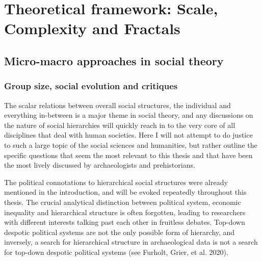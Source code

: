 \documentclass[
  12pt,
  a4paper, twoside]{book}
\begin{document}
\hypertarget{theory}{%
\chapter{Theoretical framework: Scale, Complexity and Fractals}\label{theory}}

\hypertarget{social-hierarchy}{%
\section{Micro-macro approaches in social theory}\label{social-hierarchy}}

\hypertarget{group-size-social-evolution-and-critiques}{%
\subsection{Group size, social evolution and critiques}\label{group-size-social-evolution-and-critiques}}

The scalar relations between overall social structures, the individual and everything in-between is a major theme in social theory, and any discussions on the nature of social hierarchies will quickly reach in to the very core of all disciplines that deal with human societies. Here I will not attempt to do justice to such a large topic of the social sciences and humanities, but rather outline the specific questions that seem the most relevant to this thesis and that have been the most lively discussed by archaeologists and prehistorians.

The political connotations to hierarchical social structures were already mentioned in the introduction, and will be evoked repeatedly throughout this thesis. The crucial analytical distinction between political system, economic inequality and hierarchical structure is often forgotten, leading to researchers with different interests talking past each other in fruitless debates. Top-down despotic political systems are not the only possible form of hierarchy, and inversely, a search for hierarchical structure in archaeological data is not a search for top-down despotic political systems (see Furholt, Grier, et al. 2020).
\end{document}
